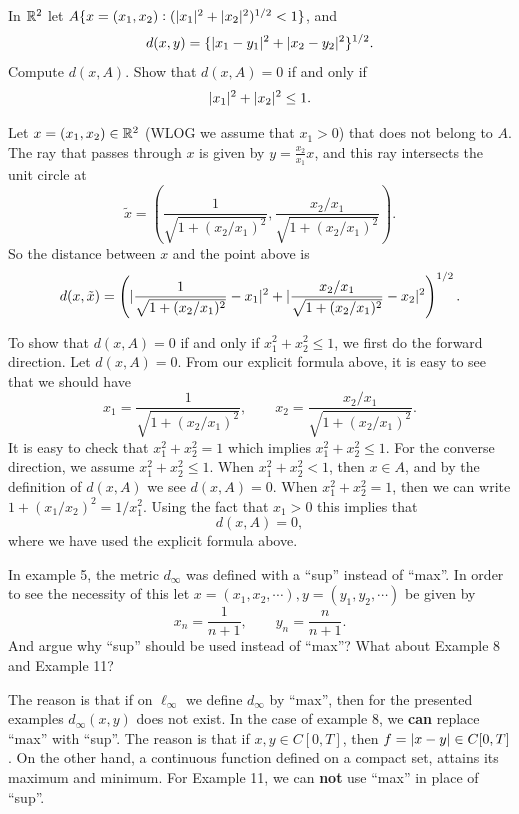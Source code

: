 \begin{problem}
	In $ \mathbb{R}^2 $ let $ A \{x=(x_1,x_2): (|x_1|^2 + |x_2|^2)^{1/2} < 1\} $, and
	\[ d(x,y) = \{|x_1-y_1|^2 + |x_2-y_2|^2\}^{1/2}. \]
	Compute $ d(x,A) $. Show that $ d(x,A) = 0 $ if and only if 
	\[ |x_1|^2 + |x_2|^2 \leq 1. \]
\end{problem}
\begin{solution}
	Let $ x = (x_1,x_2) \in \mathbb{R}^2 $ (WLOG we assume that $ x_1>0 $) that does not belong to $ A $. The ray that passes through $ x $ is given by $ y = \frac{x_2}{x_1}x $, and this ray intersects the unit circle at
	\[ \tilde{x} = (\frac{1}{\sqrt{1+(x_2/x_1)^2}}, \frac{x_2/x_1}{\sqrt{1+(x_2/x_1)^2}} ). \]
	So the distance between $ x $ and the point above is
	\[ d(x,\tilde{x}) = \left( |\frac{1}{\sqrt{1+(x_2/x_1)^2}}-x_1|^2 + |\frac{x_2/x_1}{\sqrt{1+(x_2/x_1)^2}}-x_2|^2 \right)^{1/2}. \]
	
	To show that $ d(x,A) = 0 $ if and only if $ x_1^2 + x_2^2 \leq 1 $, we first do the forward direction. Let $ d(x,A) = 0 $. From our explicit formula above, it is easy to see that we should have
	\[ x_1 = \frac{1}{\sqrt{1+(x_2/x_1)^2}}, \qquad x_2 = \frac{x_2/x_1}{\sqrt{1+(x_2/x_1)^2}}.  \]
	It is easy to check that $ x_1^2 + x_2^2 =1 $ which implies $ x_1^2 + x_2^2 \leq 1 $. For the converse direction, we assume $ x_1^2 + x_2^2 \leq 1 $. When $ x_1^2 + x_2^2 < 1 $, then $ x\in A $, and by the definition of $ d(x,A) $ we see $ d(x,A) = 0 $. When $ x_1^2 + x_2^2 = 1 $, then we can write $ 1+(x_1/x_2)^2 = 1/x_1^2 $. Using the fact that $ x_1 > 0 $ this implies that
	\[ d(x,A) = 0, \]
	where we have used the explicit formula above.
\end{solution}


\begin{problem}
	In example 5, the metric $ d_\infty $ was defined with a ``sup'' instead of ``max''. In order to see the necessity of this let $ x = (x_1,x_2,\cdots), y = (y_1,y_2,\cdots) $ be given by 
	\[ x_n = \frac{1}{n+1}, \qquad  y_n = \frac{n}{n+1}. \]
	And argue why ``sup'' should be used instead of ``max''? What about Example 8 and Example 11?
\end{problem}
\begin{solution}
	The reason is that if on $ \ell_\infty $ we define $ d_\infty $ by ``max'', then for the presented examples $ d_\infty(x,y) $ does not exist. In the case of example 8, we \textbf{can} replace ``max'' with ``sup''. The reason is that if $ x,y \in C[0,T] $, then $ f = |x-y| \in C[0,T] $. On the other hand, a continuous function defined on a compact set, attains its maximum and minimum. For Example 11, we can \textbf{not} use ``max'' in place of ``sup''.
\end{solution}


